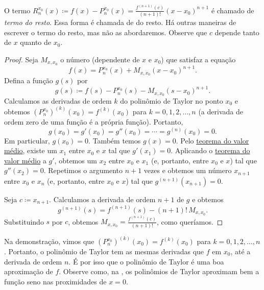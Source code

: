O termo $R_n^{x_0}(x)\coloneqq f(x)-P_n^{x_0}(x) = \frac{f^{(n+1)}(c)}{(n+1)!}{(x-x_0)}^{n+1}$ é chamado de \emph{termo do resto}. Essa forma é chamada de \emph{} do resto. Há outras maneiras de escrever o termo do resto, mas não as abordaremos. Observe que $c$ depende tanto de $x$ quanto de $x_0$.

\begin{proof}
Seja $M_{x,x_0}$ o número (dependente de $x$ e $x_0$) que satisfaz a equação
\begin{equation*}
f(x)=P_{n}^{x_0}(x)+M_{x,x_0}{(x-x_0)}^{n+1} .
\end{equation*}
Defina a função $g(s)$ por
\begin{equation*}
g(s) \coloneqq f(s)-P_n^{x_0}(s)-M_{x,x_0}{(s-x_0)}^{n+1} .
\end{equation*}
Calculamos as derivadas de ordem $k$ do polinômio de Taylor no ponto $x_0$ e obtemos ${ (P_n^{x_0})}^{(k)}(x_0) = f^{(k)}(x_0)$ para $k=0,1,2,\ldots,n$ (a derivada de ordem zero de uma função é a própria função). Portanto,
\begin{equation*}
g(x_0) = g'(x_0) = g''(x_0) = \cdots = g^{(n)}(x_0) = 0 .
\end{equation*}
Em particular, $g(x_0)=0$. Também temos $g(x)=0$. Pelo \hyperref[thm:mvt]{teorema do valor médio}, existe um $x_1$ entre $x_0$ e $x$ tal que $g'(x_1)=0$. Aplicando o \hyperref[thm:mvt]{teorema do valor médio} a $g'$, obtemos um $x_2$ entre $x_0$ e $x_1$ (e, portanto, entre $x_0$ e $x$) tal que $g''(x_2)=0$. Repetimos o argumento $n+1$ vezes e obtemos um número $x_{n+1}$ entre $x_0$ e $x_n$ (e, portanto, entre $x_0$ e $x$) tal que $g^{(n+1)}(x_{n+1})=0$.

Seja $c \coloneqq x_{n+1}$. Calculamos a derivada de ordem $n+1$ de $g$ e obtemos
\begin{equation*}
g^{(n+1)}(s) = f^{(n+1)}(s)-(n+1)!\,M_{x,x_0} .
\end{equation*}
Substituindo $s$ por $c$, obtemos $M_{x,x_0} = \frac{f^{(n+1)}(c)}{(n+1)!}$, como queríamos.
\end{proof}

Na demonstração, vimos que ${ (P_n^{x_0})}^{(k)}(x_0) = f^{(k)}(x_0)$ para $k=0,1,2,\ldots,n$. Portanto, o polinômio de Taylor tem as mesmas derivadas que $f$ em $x_0$, até a derivada de ordem $n$. É por isso que o polinômio de Taylor é uma boa aproximação de $f$. Observe como, na , os polinômios de Taylor aproximam bem a função seno nas proximidades de $x=0$.

